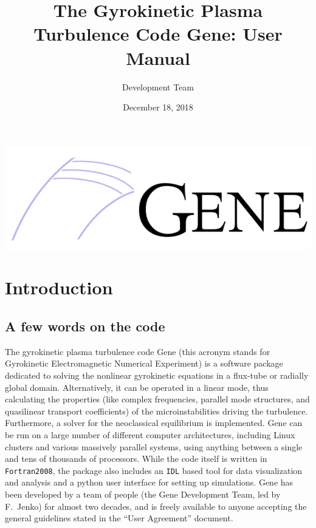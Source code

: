 \documentclass[12pt]{article}
\begin{document}
\title{The Gyrokinetic Plasma Turbulence Code {\sc Gene}: User Manual}
\vspace{1cm}
\date{\Large December 18, 2018}
\author{\gene Development Team}

\maketitle

\vspace{2cm}
\begin{center}
\includegraphics[width=\textwidth]{gene_logo2.png}
\end{center}

\thispagestyle{empty}
\newpage

\tableofcontents

\newpage
\section{Introduction}
\label{sec:intro}

\subsection{A few words on the code}
The gyrokinetic plasma turbulence code {\sc Gene} (this acronym stands for Gyrokinetic Electromagnetic
Numerical Experiment) is a software package dedicated to solving the nonlinear gyrokinetic
equations in a flux-tube or radially global domain. Alternatively, it can be operated in a linear mode, thus
calculating the properties (like complex frequencies, parallel mode structures, and quasilinear
transport coefficients) of the microinstabilities driving the turbulence. Furthermore, a solver for the neoclassical
equilibrium is implemented. {\sc Gene} can be run on
a large number of different computer architectures, including Linux clusters and various massively
parallel systems, using anything between a single and tens of thousands of processors. While the code
itself is written in {\tt Fortran2008}, the package also includes an {\tt IDL} based tool for data
visualization and analysis and a python user interface for setting up simulations. {\sc Gene} has been developed
by a team of people (the Gene Development Team, led by F.~Jenko) for almost two decades, and is freely available to anyone accepting the general guidelines stated in the ``User Agreement'' document.
\end{document}
